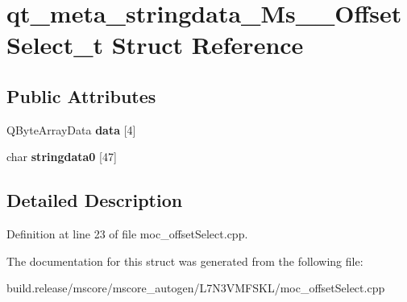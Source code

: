\hypertarget{structqt__meta__stringdata___ms_____offset_select__t}{}\section{qt\+\_\+meta\+\_\+stringdata\+\_\+\+Ms\+\_\+\+\_\+\+Offset\+Select\+\_\+t Struct Reference}
\label{structqt__meta__stringdata___ms_____offset_select__t}
\subsection*{Public Attributes}
\begin{DoxyCompactItemize}
\item 
\mbox{\label{structqt__meta__stringdata___ms_____offset_select__t_a14544acbc669f2129eb8670b321f6269}} 
Q\+Byte\+Array\+Data {\bfseries data} \mbox{[}4\mbox{]}
\item 
\mbox{\label{structqt__meta__stringdata___ms_____offset_select__t_a2e6972ccaeb7e02f87fa9e25de8a50b5}} 
char {\bfseries stringdata0} \mbox{[}47\mbox{]}
\end{DoxyCompactItemize}


\subsection{Detailed Description}


Definition at line 23 of file moc\+\_\+offset\+Select.\+cpp.



The documentation for this struct was generated from the following file\+:\begin{DoxyCompactItemize}
\item 
build.\+release/mscore/mscore\+\_\+autogen/\+L7\+N3\+V\+M\+F\+S\+K\+L/moc\+\_\+offset\+Select.\+cpp\end{DoxyCompactItemize}
